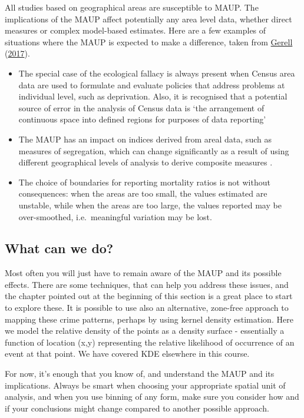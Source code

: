 \documentclass[
]{book}
\providecommand{\tightlist}{%
  \setlength{\itemsep}{0pt}\setlength{\parskip}{0pt}}
\begin{document}
All studies based on geographical areas are susceptible to MAUP. The implications of the MAUP affect potentially any area level data, whether direct measures or complex model-based estimates. Here are a few examples of situations where the MAUP is expected to make a difference, taken from \protect\hyperlink{ref-Gerell_2017}{Gerell} (\protect\hyperlink{ref-Gerell_2017}{2017}).

\begin{itemize}
\tightlist
\item
  The special case of the ecological fallacy is always present when Census area data are used to formulate and evaluate policies that address problems at individual level, such as deprivation. Also, it is recognised that a potential source of error in the analysis of Census data is `the arrangement of continuous space into defined regions for purposes of data reporting'
\item
  The MAUP has an impact on indices derived from areal data, such as measures of segregation, which can change significantly as a result of using different geographical levels of analysis to derive composite measures .
\item
  The choice of boundaries for reporting mortality ratios is not without consequences: when the areas are too small, the values estimated are unstable, while when the areas are too large, the values reported may be over-smoothed, i.e.~meaningful variation may be lost.
\end{itemize}

\hypertarget{what-can-we-do}{%
\subsection{What can we do?}\label{what-can-we-do}}

Most often you will just have to remain aware of the MAUP and its possible effects. There are some techniques, that can help you address these issues, and the chapter pointed out at the beginning of this section is a great place to start to explore these. It is possible to use also an alternative, zone-free approach to mapping these crime patterns, perhaps by using kernel density estimation. Here we model the relative density of the points as a density surface - essentially a function of location (x,y) representing the relative likelihood of occurrence of an event at that point. We have covered KDE elsewhere in this course.

For now, it's enough that you know of, and understand the MAUP and its implications. Always be smart when choosing your appropriate spatial unit of analysis, and when you use binning of any form, make sure you consider how and if your conclusions might change compared to another possible approach.
\end{document}
